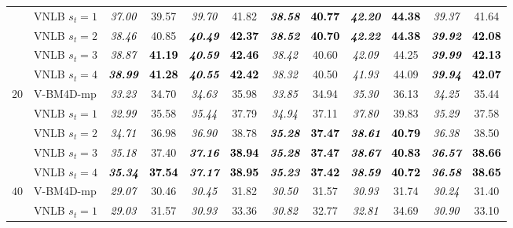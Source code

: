 \documentclass[10pt, journal, twocolumn, final, a4paper]{IEEEtran}
\newcommand{\bsic}[1]{\textcolor{black}{\textit{#1}}}
\newcommand{\Bsic}[1]{\textcolor{black}{\textbf{\textit{#1}}}}
\newcommand{\Best}[1]{\textbf{\textcolor{black}{#1}}}
\begin{document}
\begin{table}[htp!]
\begin{center}
{\begin{tabular}{ c | l |c c | c c | c c | c c | c c}
			                      & VNLB   $s_t = 1$     & \bsic{37.00} &       39.57  & \bsic{39.70} &       41.82  & \Bsic{38.58} & \Best{40.77} & \Bsic{42.20} & \Best{44.38} & \bsic{39.37} &       41.64  \\
										 & VNLB   $s_t = 2$     & \bsic{38.46} &       40.85  & \Bsic{40.49} & \Best{42.37} & \Bsic{38.52} & \Best{40.70} & \Bsic{42.22} & \Best{44.38} & \Bsic{39.92} & \Best{42.08} \\
			                      & VNLB   $s_t = 3$     & \bsic{38.87} & \Best{41.19} & \Bsic{40.59} & \Best{42.46} & \bsic{38.42} &       40.60  & \bsic{42.09} &       44.25  & \Bsic{39.99} & \Best{42.13} \\
										 & VNLB   $s_t = 4$     & \Bsic{38.99} & \Best{41.28} & \Bsic{40.55} & \Best{42.42} & \bsic{38.32} &       40.50  & \bsic{41.93} &       44.09  & \Bsic{39.94} & \Best{42.07} \\\hline
%
			\multirow{1}{*}{$20$}
			                      & V-BM4D-mp            & \bsic{33.23} &       34.70  & \bsic{34.63} &       35.98  & \bsic{33.85} &       34.94  & \bsic{35.30} &       36.13  & \bsic{34.25} &       35.44  \\
			                      & VNLB   $s_t = 1$     & \bsic{32.99} &       35.58  & \bsic{35.44} &       37.79  & \bsic{34.94} &       37.11  & \bsic{37.80} &       39.83  & \bsic{35.29} &       37.58  \\
			                      & VNLB   $s_t = 2$     & \bsic{34.71} &       36.98  & \bsic{36.90} &       38.78  & \Bsic{35.28} & \Best{37.47} & \Bsic{38.61} & \Best{40.79} & \bsic{36.38} &       38.50  \\
			                      & VNLB   $s_t = 3$     & \bsic{35.18} &       37.40  & \Bsic{37.16} & \Best{38.94} & \Bsic{35.28} & \Best{37.47} & \Bsic{38.67} & \Best{40.83} & \Bsic{36.57} & \Best{38.66} \\
										 & VNLB   $s_t = 4$     & \Bsic{35.34} & \Best{37.54} & \Bsic{37.17} & \Best{38.95} & \Bsic{35.23} & \Best{37.42} & \Bsic{38.59} & \Best{40.72} & \Bsic{36.58} & \Best{38.65} \\\hline
%
			\multirow{1}{*}{$40$}
			                      & V-BM4D-mp            & \bsic{29.07} &       30.46  & \bsic{30.45} &       31.82  & \bsic{30.50} &       31.57  & \bsic{30.93} &       31.74  & \bsic{30.24} &       31.40  \\
			                      & VNLB   $s_t = 1$     & \bsic{29.03} &       31.57  & \bsic{30.93} &       33.36  & \bsic{30.82} &       32.77  & \bsic{32.81} &       34.69  & \bsic{30.90} &       33.10  \\

\end{tabular}}
\end{center}
\end{table}
\end{document}
